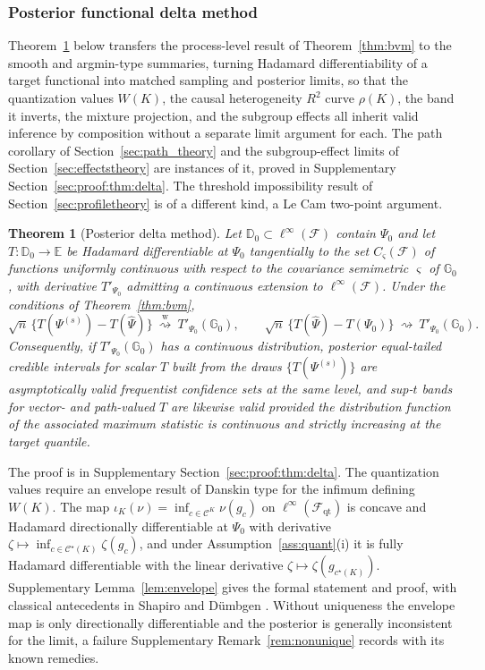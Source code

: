 \documentclass[11pt]{article}
\newtheorem{theorem}{Theorem}%
\newcommand{\G}{\mathbb G}
\newcommand{\dto}{\rightsquigarrow}
\newcommand{\dtow}{\overset{\mathrm w}{\rightsquigarrow}}
\newcommand{\calC}{\mathcal C}
\newcommand{\calF}{\mathcal F}
\newcommand{\hPsi}{\widehat\Psi}
\begin{document}
\subsubsection{Posterior functional delta method}\label{sec:delta}

Theorem~\ref{thm:delta} below transfers the process-level result of Theorem~\ref{thm:bvm} to the smooth and argmin-type summaries, turning Hadamard differentiability of a target functional into matched sampling and posterior limits, so that the quantization values $W(K)$, the causal heterogeneity $R^2$ curve $\rho(K)$, the band it inverts, the mixture projection, and the subgroup effects all inherit valid inference by composition without a separate limit argument for each. The path corollary of Section~\ref{sec:path_theory} and the subgroup-effect limits of Section~\ref{sec:effectstheory} are instances of it, proved in Supplementary Section~\ref{sec:proof:thm:delta}. The threshold impossibility result of Section~\ref{sec:profiletheory} is of a different kind, a Le Cam two-point argument.

\begin{theorem}[Posterior delta method]\label{thm:delta}
Let $\mathbb D_0\subset\ell^\infty(\calF)$ contain $\Psi_0$ and let $T:\mathbb D_0\to\mathbb E$ be Hadamard differentiable at $\Psi_0$ tangentially to the set $C_\varsigma(\calF)$ of functions uniformly continuous with respect to the covariance semimetric $\varsigma$ of $\G_0$, with derivative $T'_{\Psi_0}$ admitting a continuous extension to $\ell^\infty(\calF)$. Under the conditions of Theorem~\ref{thm:bvm},
\begin{equation*}
\sqrt n\,\bigl\{T(\Psi^{(s)})-T(\hPsi)\bigr\}\ \dtow\ T'_{\Psi_0}(\G_0),
\qquad
\sqrt n\,\bigl\{T(\hPsi)-T(\Psi_0)\bigr\}\ \dto\ T'_{\Psi_0}(\G_0).
\end{equation*}
Consequently, if $T'_{\Psi_0}(\G_0)$ has a continuous distribution, posterior equal-tailed credible intervals for scalar $T$ built from the draws $\{T(\Psi^{(s)})\}$ are asymptotically valid frequentist confidence sets at the same level, and sup-$t$ bands for vector- and path-valued $T$ are likewise valid provided the distribution function of the associated maximum statistic is continuous and strictly increasing at the target quantile.
\end{theorem}

The proof is in Supplementary Section~\ref{sec:proof:thm:delta}. The quantization values require an envelope result of Danskin type for the infimum defining $W(K)$. The map $\iota_K(\nu)=\inf_{c\in\calC^K}\nu(g_c)$ on $\ell^\infty(\calF_{\mathrm{qt}})$ is concave and Hadamard directionally differentiable at $\Psi_0$ with derivative $\zeta\mapsto\inf_{c\in\calC^\star(K)}\zeta(g_c)$, and under Assumption~\ref{ass:quant}\textup{(i)} it is fully Hadamard differentiable with the linear derivative $\zeta\mapsto\zeta(g_{c^\star(K)})$. Supplementary Lemma~\ref{lem:envelope} gives the formal statement and proof, with classical antecedents in Shapiro \cite{shapiro1991} and D\"umbgen \cite{dumbgen1993}.
Without uniqueness the envelope map is only directionally differentiable and the posterior is generally inconsistent for the limit, a failure Supplementary Remark~\ref{rem:nonunique} records with its known remedies.
\end{document}
